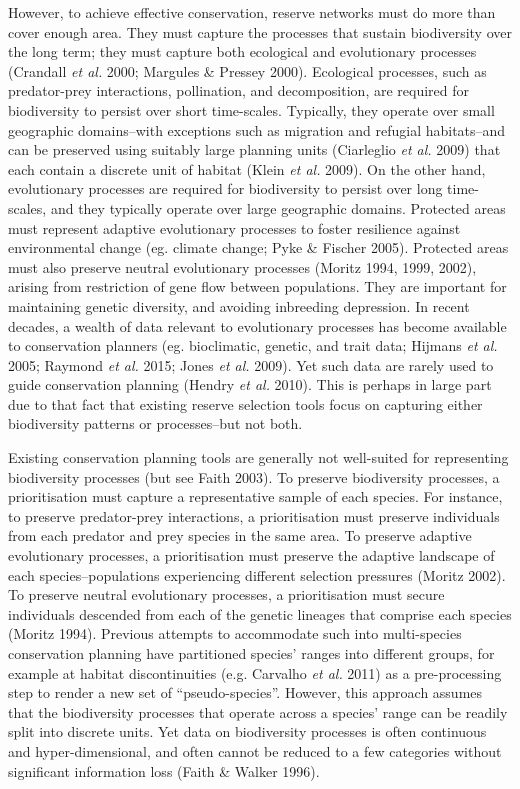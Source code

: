 \documentclass[11pt,]{article}
\begin{document}
However, to achieve effective conservation, reserve networks must do
more than cover enough area. They must capture the processes that
sustain biodiversity over the long term; they must capture both
ecological and evolutionary processes (Crandall \emph{et al.} 2000;
Margules \& Pressey 2000). Ecological processes, such as predator-prey
interactions, pollination, and decomposition, are required for
biodiversity to persist over short time-scales. Typically, they operate
over small geographic domains--with exceptions such as migration and
refugial habitats--and can be preserved using suitably large planning
units (Ciarleglio \emph{et al.} 2009) that each contain a discrete unit
of habitat (Klein \emph{et al.} 2009). On the other hand, evolutionary
processes are required for biodiversity to persist over long
time-scales, and they typically operate over large geographic domains.
Protected areas must represent adaptive evolutionary processes to foster
resilience against environmental change (eg. climate change; Pyke \&
Fischer 2005). Protected areas must also preserve neutral evolutionary
processes (Moritz 1994, 1999, 2002), arising from restriction of gene
flow between populations. They are important for maintaining genetic
diversity, and avoiding inbreeding depression. In recent decades, a
wealth of data relevant to evolutionary processes has become available
to conservation planners (eg. bioclimatic, genetic, and trait data;
Hijmans \emph{et al.} 2005; Raymond \emph{et al.} 2015; Jones \emph{et
al.} 2009). Yet such data are rarely used to guide conservation planning
(Hendry \emph{et al.} 2010). This is perhaps in large part due to that
fact that existing reserve selection tools focus on capturing either
biodiversity patterns or processes--but not both.

Existing conservation planning tools are generally not well-suited for
representing biodiversity processes (but see Faith 2003). To preserve
biodiversity processes, a prioritisation must capture a representative
sample of each species. For instance, to preserve predator-prey
interactions, a prioritisation must preserve individuals from each
predator and prey species in the same area. To preserve adaptive
evolutionary processes, a prioritisation must preserve the adaptive
landscape of each species--populations experiencing different selection
pressures (Moritz 2002). To preserve neutral evolutionary processes, a
prioritisation must secure individuals descended from each of the
genetic lineages that comprise each species (Moritz 1994). Previous
attempts to accommodate such into multi-species conservation planning
have partitioned species' ranges into different groups, for example at
habitat discontinuities (e.g. Carvalho \emph{et al.} 2011) as a
pre-processing step to render a new set of ``pseudo-species''. However,
this approach assumes that the biodiversity processes that operate
across a species' range can be readily split into discrete units. Yet
data on biodiversity processes is often continuous and
hyper-dimensional, and often cannot be reduced to a few categories
without significant information loss (Faith \& Walker 1996).
\end{document}
